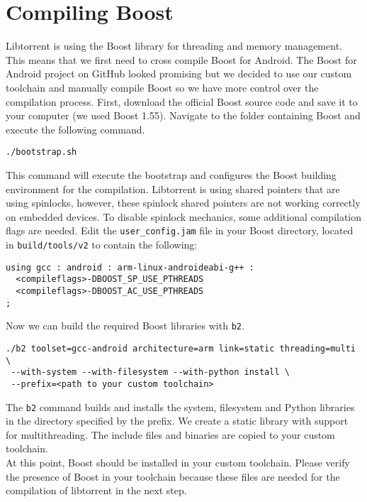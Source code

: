 \section{Compiling Boost}
	Libtorrent is using the Boost library for threading and memory management. This means that we first need to cross compile Boost for Android. The Boost for Android project on GitHub looked promising but we decided to use our custom toolchain and manually compile Boost so we have more control over the compilation process. First, download the official Boost source code and save it to your computer (we used Boost 1.55). Navigate to the folder containing Boost and execute the following command.
	\begin{lstlisting}
./bootstrap.sh
	\end{lstlisting}
	This command will execute the bootstrap and configures the Boost building environment for the compilation. Libtorrent is using shared pointers that are using spinlocks, however, these spinlock shared pointers are not working correctly on embedded devices. To disable spinlock mechanics, some additional compilation flags are needed. Edit the \texttt{user\_config.jam} file in your Boost directory, located in \texttt{build/tools/v2} to contain the following:
	\begin{lstlisting}
using gcc : android : arm-linux-androideabi-g++ : 
  <compileflags>-DBOOST_SP_USE_PTHREADS 
  <compileflags>-DBOOST_AC_USE_PTHREADS
;
	\end{lstlisting}
	Now we can build the required Boost libraries with \texttt{b2}.
	\begin{lstlisting}
./b2 toolset=gcc-android architecture=arm link=static threading=multi \
 --with-system --with-filesystem --with-python install \
 --prefix=<path to your custom toolchain>
	\end{lstlisting}
	The \texttt{b2} command builds and installs the system, filesystem and Python libraries in the directory specified by the prefix. We create a static library with support for multithreading. The include files and binaries are copied to your custom toolchain.\\
	At this point, Boost should be installed in your custom toolchain. Please verify the presence of Boost in your toolchain because these files are needed for the compilation of libtorrent in the next step.